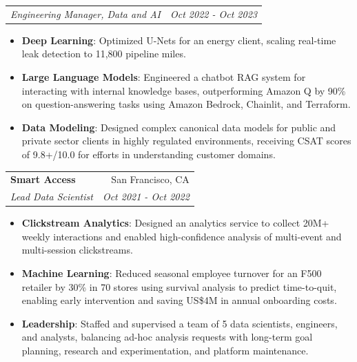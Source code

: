 \documentclass[letterpaper,11pt]{article}
\makeatletter
\newcommand{\resumeItem}[2]{
  \item\small{
    \textbf{#1}{: #2 \vspace{-2pt}}
  }
}
\newcommand{\resumeSubheading}[4]{
  \vspace{-1pt}\item
    \begin{tabular*}{0.97\textwidth}[t]{l@{\extracolsep{\fill}}r}
      \textbf{#1} & #2 \\
      \textit{\small#3} & \textit{\small #4} \\
    \end{tabular*}\vspace{-5pt}
}
\newcommand{\resumeSubSubheading}[2]{
    \begin{tabular*}{0.97\textwidth}{l@{\extracolsep{\fill}}r}
      \textit{\small#1} & \textit{\small #2} \\
    \end{tabular*}\vspace{-5pt}
}
\newcommand{\resumeSubHeadingListEnd}{\end{itemize}}
\newcommand{\resumeItemListStart}{\begin{itemize}}
\newcommand{\resumeItemListEnd}{\end{itemize}\vspace{-5pt}}
\makeatother
\begin{document}
   \resumeSubSubheading
    {Engineering Manager, Data and AI}{Oct 2022 - Oct 2023}
    \resumeItemListStart
       \resumeItem{Deep Learning}
          {Optimized U-Nets for an energy client, scaling real-time leak detection to 11,800 pipeline miles.}
       \resumeItem{Large Language Models}
         {Engineered a chatbot RAG system for interacting with internal knowledge bases, outperforming Amazon Q by 90\% on question-answering tasks using Amazon Bedrock, Chainlit, and Terraform.}
       \resumeItem{Data Modeling}
          {Designed complex canonical data models for public and private sector clients in highly regulated environments, receiving CSAT scores of 9.8+/10.0 for efforts in understanding customer domains.}
    \resumeItemListEnd

    \resumeSubheading
      {Smart Access}{San Francisco, CA}
      {Lead Data Scientist}{Oct 2021 - Oct 2022}
      \resumeItemListStart
        \resumeItem{Clickstream Analytics}
          {Designed an analytics service to collect 20M+ weekly interactions and enabled high-confidence analysis of multi-event and multi-session clickstreams.}
        \resumeItem{Machine Learning}
          {Reduced seasonal employee turnover for an F500 retailer by 30\% in 70 stores using survival analysis to predict time-to-quit, enabling early intervention and saving US\$4M in annual onboarding costs.}
        \resumeItem{Leadership}
          {Staffed and supervised a team of 5 data scientists, engineers, and analysts, balancing ad-hoc analysis requests with long-term goal planning, research and experimentation, and platform maintenance.}
      \resumeItemListEnd
\end{document}
